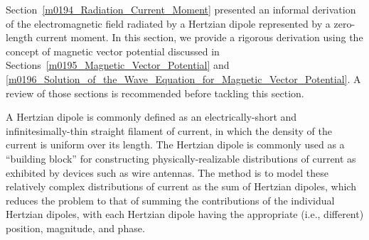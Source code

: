 

\label{m0197_Radiation_from_a_Hertzian_Dipole} %

Section~\ref{m0194_Radiation_Current_Moment} presented an informal derivation of the electromagnetic field radiated by a Hertzian dipole represented by a zero-length current moment.  
In this section, we provide a rigorous derivation using the concept of magnetic vector potential discussed in Sections~\ref{m0195_Magnetic_Vector_Potential} and \ref{m0196_Solution_of_the_Wave_Equation_for_Magnetic_Vector_Potential}. 
A review of those sections is recommended before tackling this section.

A Hertzian dipole is commonly defined as an electrically-short and infinitesimally-thin straight filament of current, in which the density of the current is uniform over its length.
The Hertzian dipole is commonly used as a ``building block'' for constructing physically-realizable distributions of current as exhibited by devices such as wire antennas. 
The method is to model these relatively complex distributions of current as the sum of Hertzian dipoles, which reduces the problem to that of summing the contributions of the individual Hertzian dipoles, with each Hertzian dipole having the appropriate (i.e., different) position, magnitude, and phase.


